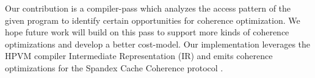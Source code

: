 Our contribution is a compiler-pass which analyzes the access pattern of the given program to identify certain opportunities for coherence optimization. We hope future work will build on this pass to support more kinds of coherence optimizations and develop a better cost-model. Our implementation leverages the HPVM compiler Intermediate Representation (IR) \cite{HPVM} and emits coherence optimizations for the Spandex Cache Coherence protocol \cite{Spandex}.